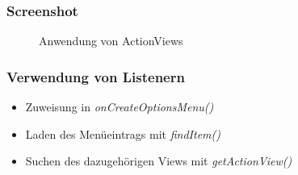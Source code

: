 \begin{frame}
   \frametitle{Screenshot}
   \begin{figure}[h!]
     \centering
     \hfill
     \caption{
        Anwendung von ActionViews
     }
     \label{fig:action_view}
   \end{figure}
\end{frame}

\begin{frame}
   \frametitle{Verwendung von Listenern}
   \begin{itemize}
      \item Zuweisung in \emph{onCreateOptionsMenu()}
      \item Laden des Menüeintrags mit \emph{findItem()}
      \item Suchen des dazugehörigen Views mit \emph{getActionView()}
   \end{itemize}

   
\end{frame}

